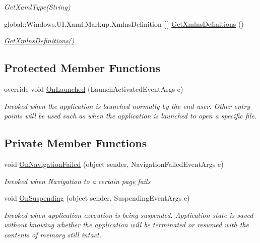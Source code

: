 \begin{DoxyCompactItemize}
\begin{DoxyCompactList}\small\item\em Get\+Xaml\+Type(\+String) \end{DoxyCompactList}\item 
global\+::\+Windows.\+U\+I.\+Xaml.\+Markup.\+Xmlns\+Definition \mbox{[}$\,$\mbox{]} \hyperlink{class_eli_log_in_app_1_1_app_a1bb4d4a1609ef93a317c8d25a87d2d0c}{Get\+Xmlns\+Definitions} ()
\begin{DoxyCompactList}\small\item\em \hyperlink{class_eli_log_in_app_1_1_app_a1bb4d4a1609ef93a317c8d25a87d2d0c}{Get\+Xmlns\+Definitions()} \end{DoxyCompactList}\end{DoxyCompactItemize}
\subsection*{Protected Member Functions}
\begin{DoxyCompactItemize}
\item 
override void \hyperlink{class_eli_log_in_app_1_1_app_a1e8b33f0562bd7a21968aa889dacc27a}{On\+Launched} (Launch\+Activated\+Event\+Args e)
\begin{DoxyCompactList}\small\item\em Invoked when the application is launched normally by the end user. Other entry points will be used such as when the application is launched to open a specific file. \end{DoxyCompactList}\end{DoxyCompactItemize}
\subsection*{Private Member Functions}
\begin{DoxyCompactItemize}
\item 
void \hyperlink{class_eli_log_in_app_1_1_app_a7a14c74fe5ac21c8a291d6f1e6a2f7d8}{On\+Navigation\+Failed} (object sender, Navigation\+Failed\+Event\+Args e)
\begin{DoxyCompactList}\small\item\em Invoked when Navigation to a certain page fails \end{DoxyCompactList}\item 
void \hyperlink{class_eli_log_in_app_1_1_app_a39cc4ef1590b3427d08aca7deb4f45f6}{On\+Suspending} (object sender, Suspending\+Event\+Args e)
\begin{DoxyCompactList}\small\item\em Invoked when application execution is being suspended. Application state is saved without knowing whether the application will be terminated or resumed with the contents of memory still intact. \end{DoxyCompactList}\end{DoxyCompactItemize}
